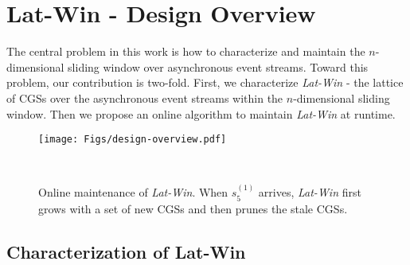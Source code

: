 \documentclass[12pt,journal,letterpaper,compsoc]{IEEEtran}
\begin{document}
\section{Lat-Win - Design Overview}
\label{sec:design-overview}

The central problem in this work is how to characterize and maintain the $n$-dimensional sliding window over asynchronous event streams. Toward this problem, our contribution is two-fold. First, we characterize {\it Lat-Win} - the lattice of CGSs over the asynchronous event streams within the $n$-dimensional sliding window. Then we propose an online algorithm to maintain {\it Lat-Win} at runtime.
\begin{figure}[htbp]
        \begin{minipage}[b]{1\textwidth}
        \centering
        \texttt{[image: Figs/design-overview.pdf]}
        \end{minipage}\\
    \hspace*{\fill}
    \hspace*{\fill}
    \caption{Online maintenance of {\it Lat-Win}. When $s^{(1)}_5$ arrives, {\it Lat-Win} first grows with a set of new CGSs and then prunes the stale CGSs.}
    \label{F:design overview}
\end{figure}

\subsection{Characterization of Lat-Win}
\end{document}
